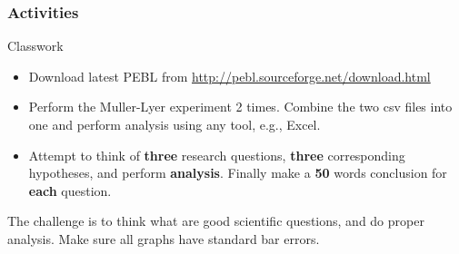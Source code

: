 \documentclass{beamer}
\begin{document}
\begin{frame}
	\frametitle{Activities}
	\footnotesize
	\begin{block}{Classwork}
	\begin{itemize}
	\item Download latest PEBL from \url{http://pebl.sourceforge.net/download.html}
	\item Perform the Muller-Lyer experiment 2 times.   Combine the two csv files into one and perform analysis using any tool,  e.g., Excel.
	\item Attempt to think of \textbf{three} research questions,  \textbf{three} corresponding hypotheses, and perform \textbf{analysis}.  Finally make a \textbf{50} words conclusion for \textbf{each} question.
	\end{itemize}
%		
%		
		
The challenge is to think what are good scientific questions, and do proper analysis.  Make sure all graphs have standard bar errors.
		
	\end{block}
\end{frame}
%

%

%
%
%
%
%
%
\end{document}

